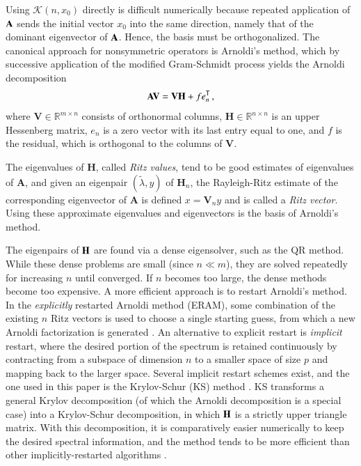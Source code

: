 Using $\mathcal{K}(n, x_0)$ directly is difficult numerically because
repeated application of $\mathbf{A}$ sends the initial vector $x_0$ into the
same direction, namely that of the dominant eigenvector of $\mathbf{A}$.  
Hence, the basis 
must be orthogonalized. The canonical approach for nonsymmetric 
operators is Arnoldi's method, which by successive application of the 
modified Gram-Schmidt process yields the Arnoldi decomposition
\begin{equation}
 \mathbf{A}\mathbf{V} = \mathbf{V} \mathbf{H} + fe^{\mathsf{T}}_n \, ,
\end{equation}
where $\mathbf{V} \in \mathbb{R}^{m\times n}$  consists of
orthonormal columns,
$\mathbf{H} \in \mathbb{R}^{n \times n} $ is an upper Hessenberg matrix, 
$e_n$ is a zero vector with its last entry equal to one, and $f$ is 
the residual, which is orthogonal to the columns of $\mathbf{V}$.  

The eigenvalues of $\mathbf{H}$, called {\it Ritz values}, tend to
be good estimates of eigenvalues of $\mathbf{A}$, and given an eigenpair
$(\tilde{\lambda}, y)$ of $\mathbf{H}_n$, the Rayleigh-Ritz estimate of the
corresponding eigenvector of $\mathbf{A}$ is defined $x = \mathbf{V}_n y$ and
is called a {\it Ritz vector}.  Using these approximate 
eigenvalues and eigenvectors is the basis of Arnoldi's method.

The eigenpairs of $\mathbf{H}$ are found via a dense eigensolver, such as 
the QR method.  While these dense problems are small (since $n \ll m$), 
they are solved repeatedly for increasing $n$ until converged.  
If $n$ becomes too large, the dense methods become too expensive.  A 
more efficient approach is to restart Arnoldi's method. In 
the {\it explicitly} restarted Arnoldi method (ERAM), some combination of 
the existing $n$ Ritz vectors is used to choose a single starting guess, 
from which a new Arnoldi factorization is generated \cite{slepc}.
An alternative to explicit restart is {\it implicit} restart, where the 
desired portion of the spectrum is retained continuously by contracting 
from a subspace of dimension $n$ to a smaller space of size $p$ and mapping 
back to the larger space. 
Several implicit restart schemes exist, and the one used in this paper 
is the Krylov-Schur (KS) method
\cite{stewart2002ksa}.  KS transforms a general Krylov decomposition 
(of which the Arnoldi decomposition is a special case) into a Krylov-Schur 
decomposition, in which $\mathbf{H}$ is a strictly upper triangle matrix.
With this decomposition, it is comparatively
easier numerically to keep the desired spectral information, and the 
method tends to be more efficient than other implicitly-restarted 
algorithms \cite{slepc}. 

